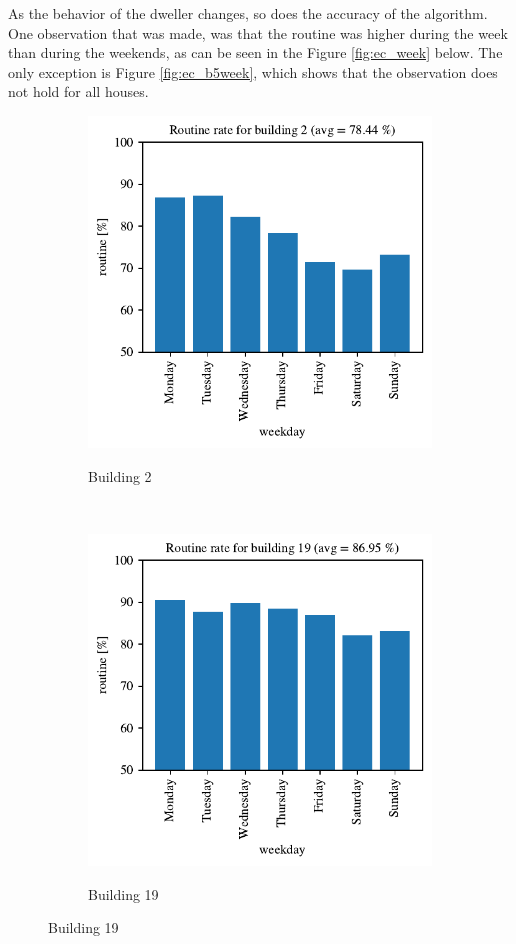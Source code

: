 As the behavior of the dweller changes, so does the accuracy of the algorithm. 
One observation that was made, was that the routine was higher during the week than during the weekends,
as can be seen in the Figure \ref{fig:ec_week} below. 
The only exception is Figure \ref{fig:ec_b5week}, which shows that the observation does not hold for all houses. 

\begin{figure}[H]
	\begin{subfigure}{.5\textwidth}
		\caption{Building 2}
		\includegraphics[width=1\linewidth]{../Figures/EC/b2week.pdf}
		\label{fig:ec_b2week}
	\end{subfigure}%
	~ 
	\begin{subfigure}{.5\textwidth}
		\caption{Building 19}
		\includegraphics[width=1\linewidth]{../Figures/EC/b19week.pdf}
		\label{fig:ec_b19week}
	\end{subfigure}%
    \bigskip


\end{figure}
